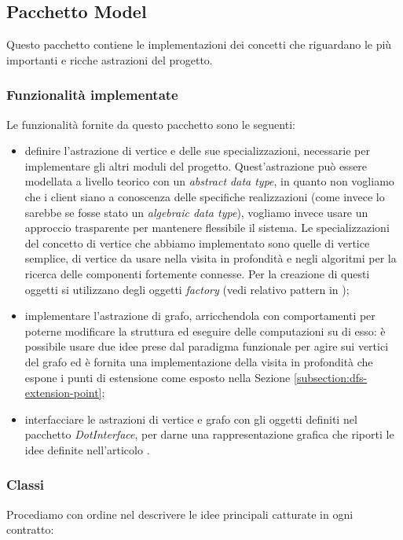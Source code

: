 \subsection{Pacchetto Model}
\label{subsection:model-package-description}
Questo pacchetto contiene le implementazioni dei concetti che riguardano
le pi\`u importanti e ricche astrazioni del progetto.

\subsubsection*{Funzionalit\`a implementate}
\label{subsection:model-supplied-abstractions}
Le funzionalit\`a fornite da questo pacchetto sono le seguenti:
\begin{itemize}
\label{itemize:model-supplied-abstraction}
\item definire l'astrazione di vertice e delle sue specializzazioni,
  necessarie per implementare gli altri moduli del
  progetto. Quest'astrazione pu\`o essere modellata a livello teorico
  con un \emph{abstract data type}, in quanto non vogliamo che i
  client siano a conoscenza delle specifiche realizzazioni (come
  invece lo sarebbe se fosse stato un \emph{algebraic data type}),
  vogliamo invece usare un approccio trasparente per mantenere
  flessibile il sistema. Le specializzazioni del concetto di vertice
  che abbiamo implementato sono quelle di vertice semplice, di vertice
  da usare nella visita in profondit\`a e negli algoritmi per la
  ricerca delle componenti fortemente connesse. Per la creazione di
  questi oggetti si utilizzano degli oggetti \emph{factory} (vedi
  relativo pattern in \cite{SmalltalkCompanion98});
\item implementare l'astrazione di grafo, arricchendola con
  comportamenti per poterne modificare la struttura ed eseguire delle
  computazioni su di esso: \`e possibile usare due idee prese dal
  paradigma funzionale per agire sui vertici del grafo ed \`e fornita
  una implementazione della visita in profondit\`a che espone i punti
  di estensione come esposto nella Sezione
  \ref{subsection:dfs-extension-point};
\item interfacciare le astrazioni di vertice e grafo con gli oggetti
  definiti nel pacchetto \emph{DotInterface}, per darne una
  rappresentazione grafica che riporti le idee definite nell'articolo
  \cite{tellingStories}.
\end{itemize}

\subsubsection*{Classi}
Procediamo con ordine nel descrivere le idee principali catturate in
ogni contratto:

